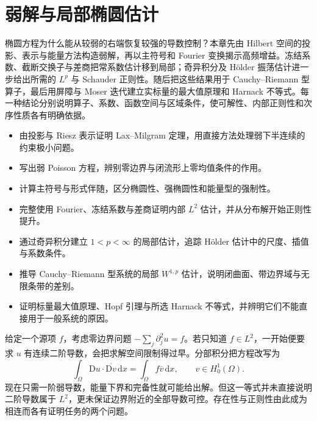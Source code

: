
% 
% 

\chapter{弱解与局部椭圆估计}
\label{g3:ch:12}

\begin{chapterabstract}
椭圆方程为什么能从较弱的右端恢复较强的导数控制？本章先由 Hilbert 空间的投影、表示与能量方法构造弱解，再以主符号和 Fourier 变换揭示高频增益。冻结系数、截断交换子与差商把常系数估计移到局部；奇异积分及 Hölder 振荡估计进一步给出所需的 \(L^p\) 与 Schauder 正则性。随后把这些结果用于 Cauchy--Riemann 型算子，最后用屏障与 Moser 迭代建立实标量的最大值原理和 Harnack 不等式。每一种结论分别说明算子、系数、函数空间与区域条件，使可解性、内部正则性和次序性质各有明确依据。
\end{chapterabstract}

\begin{learninggoals}
\begin{itemize}
	\item 由投影与 Riesz 表示证明 Lax--Milgram 定理，用直接方法处理弱下半连续的约束极小问题。
	\item 写出弱 Poisson 方程，辨别零边界与闭流形上零均值条件的作用。
	\item 计算主符号与形式伴随，区分椭圆性、强椭圆性和能量型的强制性。
	\item 完整使用 Fourier、冻结系数与差商证明内部 \(L^2\) 估计，并从分布解开始正则性提升。
	\item 通过奇异积分建立 \(1<p<\infty\) 的局部估计，追踪 Hölder 估计中的尺度、插值与系数条件。
	\item 推导 Cauchy--Riemann 型系统的局部 \(W^{1,p}\) 估计，说明闭曲面、带边界域与无限条带的差别。
	\item 证明标量最大值原理、Hopf 引理与所选 Harnack 不等式，并辨明它们不能直接用于一般系统的原因。
\end{itemize}
\end{learninggoals}

给定一个源项 \(f\)，考虑零边界问题 \(-\sum_j\partial_j^2u=f\)。若只知道 \(f\in L^2\)，一开始便要求 \(u\) 有连续二阶导数，会把求解空间限制得过早。分部积分把方程改写为
\[
	\int_\Omega \mathrm Du\cdot\overline{\mathrm Dv}\,\mathrm dx
	=\int_\Omega f\overline v\,\mathrm dx,
	\qquad v\in H_0^1(\Omega).
\]
现在只需一阶弱导数，能量下界和完备性就可能给出解。但这一等式并未直接说明二阶导数属于 \(L^2\)，更未保证边界附近的全部导数可控。存在性与正则性由此成为相连而各有证明任务的两个问题。

